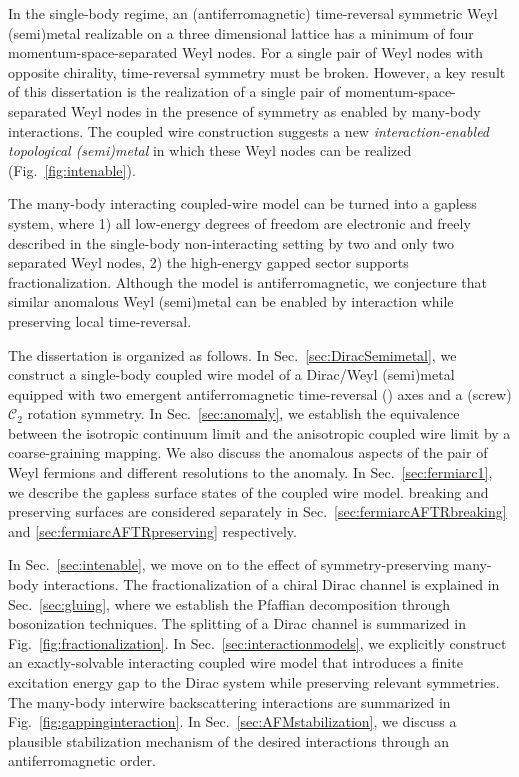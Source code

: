 In the single-body regime, an (antiferromagnetic) time-reversal symmetric Weyl (semi)metal realizable on a three dimensional lattice has a minimum of four momentum-space-separated Weyl nodes. For a single pair of Weyl nodes with opposite chirality, time-reversal symmetry must be broken. However, a key result of this dissertation is the realization of a single pair of momentum-space-separated Weyl nodes in the presence of \AFTR symmetry as enabled by many-body interactions. The coupled wire construction suggests a new {\em interaction-enabled topological (semi)metal} in which these Weyl nodes can be realized (Fig.~\ref{fig:intenable}). 

The many-body interacting coupled-wire model can be turned into a gapless system, where 1) all low-energy degrees of freedom are electronic and freely described in the single-body non-interacting setting by two and only two separated Weyl nodes, 2) the high-energy gapped sector supports fractionalization. Although the model is antiferromagnetic, we conjecture that similar anomalous Weyl (semi)metal can be enabled by interaction while preserving local time-reversal.

The dissertation is organized as follows. In Sec.~\ref{sec:DiracSemimetal}, we construct a single-body coupled wire model of a Dirac/Weyl (semi)metal equipped with two emergent antiferromagnetic time-reversal (\AFTR) axes and a (screw) $\mathcal{C}_2$ rotation symmetry. In Sec.~\ref{sec:anomaly}, we establish the equivalence between the isotropic continuum limit and the anisotropic coupled wire limit by a coarse-graining mapping. We also discuss the anomalous aspects of the pair of Weyl fermions and different resolutions to the anomaly. In Sec.~\ref{sec:fermiarc1}, we describe the gapless surface states of the coupled wire model. \AFTR breaking and preserving surfaces are considered separately in Sec.~\ref{sec:fermiarcAFTRbreaking} and \ref{sec:fermiarcAFTRpreserving} respectively.

In Sec.~\ref{sec:intenable}, we move on to the effect of symmetry-preserving many-body interactions. The fractionalization of a chiral Dirac channel is explained in Sec.~\ref{sec:gluing}, where we establish the Pfaffian decomposition through bosonization techniques. The splitting of a Dirac channel is summarized in Fig.~\ref{fig:fractionalization}. In Sec.~\ref{sec:interactionmodels}, we explicitly construct an exactly-solvable interacting coupled wire model that introduces a finite excitation energy gap to the Dirac system while preserving relevant symmetries. The many-body interwire backscattering interactions are summarized in Fig.~\ref{fig:gappinginteraction}. In Sec.~\ref{sec:AFMstabilization}, we discuss a plausible stabilization mechanism of the desired interactions through an antiferromagnetic order. 

